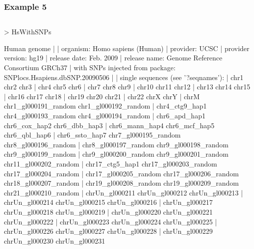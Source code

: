 \documentclass{beamer}
\begin{document}
\begin{frame}[fragile]
\frametitle{Example 5}
\begin{column}[t]{1\textwidth}%
        \begin{uncoverenv}
\begin{Schunk}
\begin{Sinput}
> HsWithSNPs
\end{Sinput}
\begin{Soutput}
Human genome
| 
| organism: Homo sapiens (Human)
| provider: UCSC
| provider version: hg19
| release date: Feb. 2009
| release name: Genome Reference Consortium GRCh37
| with SNPs injected from package: SNPlocs.Hsapiens.dbSNP.20090506
| 
| single sequences (see '?seqnames'):
|   chr1                   chr2                   chr3                 
|   chr4                   chr5                   chr6                 
|   chr7                   chr8                   chr9                 
|   chr10                  chr11                  chr12                
|   chr13                  chr14                  chr15                
|   chr16                  chr17                  chr18                
|   chr19                  chr20                  chr21                
|   chr22                  chrX                   chrY                 
|   chrM                   chr1_gl000191_random   chr1_gl000192_random 
|   chr4_ctg9_hap1         chr4_gl000193_random   chr4_gl000194_random 
|   chr6_apd_hap1          chr6_cox_hap2          chr6_dbb_hap3        
|   chr6_mann_hap4         chr6_mcf_hap5          chr6_qbl_hap6        
|   chr6_ssto_hap7         chr7_gl000195_random   chr8_gl000196_random 
|   chr8_gl000197_random   chr9_gl000198_random   chr9_gl000199_random 
|   chr9_gl000200_random   chr9_gl000201_random   chr11_gl000202_random
|   chr17_ctg5_hap1        chr17_gl000203_random  chr17_gl000204_random
|   chr17_gl000205_random  chr17_gl000206_random  chr18_gl000207_random
|   chr19_gl000208_random  chr19_gl000209_random  chr21_gl000210_random
|   chrUn_gl000211         chrUn_gl000212         chrUn_gl000213       
|   chrUn_gl000214         chrUn_gl000215         chrUn_gl000216       
|   chrUn_gl000217         chrUn_gl000218         chrUn_gl000219       
|   chrUn_gl000220         chrUn_gl000221         chrUn_gl000222       
|   chrUn_gl000223         chrUn_gl000224         chrUn_gl000225       
|   chrUn_gl000226         chrUn_gl000227         chrUn_gl000228       
|   chrUn_gl000229         chrUn_gl000230         chrUn_gl000231       

\end{Soutput}
\end{Schunk}
\end{uncoverenv}
\end{column}
\end{frame}
\end{document}
